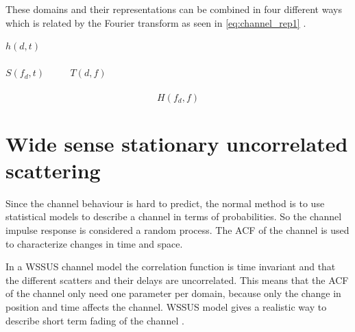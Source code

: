 These domains and their representations can be combined in four different ways which is related by the Fourier transform as seen in \autoref{eq:channel_rep1} \citep[ch. 6.3]{The_Mobile_Radio_Propagation_Channelbook}.

\begin{center}
$h(d,t)$\\
\\
$S(f_d,t)$ $\quad \quad$ $T( d,f)$\\
\\
\vspace{-1.9em}
\begin{equation}\label{eq:channel_rep1}
H(f_d,f)
\end{equation}
\end{center}
\begin{where}
\end{where}



\section{Wide sense stationary uncorrelated scattering}

Since the channel behaviour is hard to predict, the normal method is to use statistical models to describe a channel in terms of probabilities. So the channel impulse response is considered a random process. The \gls{ACF} of the channel is used to characterize changes in time and space.

In a \gls{WSSUS} channel model the correlation function is time invariant and that the different scatters and their delays are uncorrelated. This means that the ACF of the channel only need one parameter per domain, because only the change in position and time affects the channel. WSSUS model gives a realistic way to describe short term fading of the channel \citep[ch. 6.5-6.6]{The_Mobile_Radio_Propagation_Channelbook}.

